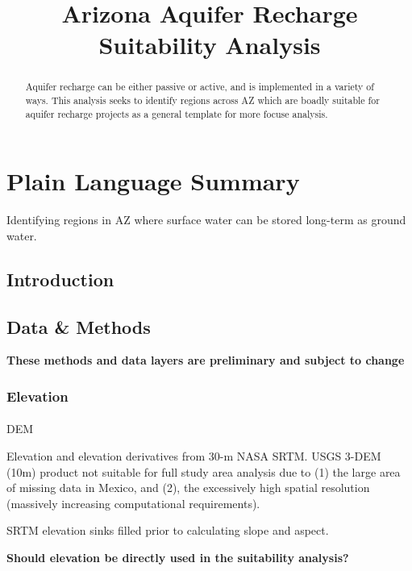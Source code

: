\documentclass[
]{agujournal2019}
\makeatletter
\let\oldparagraph\paragraph
\renewcommand{\paragraph}{
    \@ifstar
      \xxxParagraphStar
      \xxxParagraphNoStar
  }
\newcommand{\xxxParagraphStar}[1]{\oldparagraph*{#1}\mbox{}}
\newcommand{\xxxParagraphNoStar}[1]{\oldparagraph{#1}\mbox{}}
\makeatother
\begin{document}
\title{Arizona Aquifer Recharge Suitability Analysis}



\begin{abstract}
Aquifer recharge can be either passive or active, and is implemented in
a variety of ways. This analysis seeks to identify regions across AZ
which are boadly suitable for aquifer recharge projects as a general
template for more focuse analysis.
\end{abstract}

\section*{Plain Language Summary}
Identifying regions in AZ where surface water can be stored long-term as
ground water.




\subsection{Introduction}\label{introduction}

\subsection{Data \& Methods}\label{sec-data-methods}

\textbf{These methods and data layers are preliminary and subject to
change}

\subsubsection{Elevation}\label{elevation}

\paragraph{DEM}\label{dem}

Elevation and elevation derivatives from 30-m NASA SRTM. USGS 3-DEM
(10m) product not suitable for full study area analysis due to (1) the
large area of missing data in Mexico, and (2), the excessively high
spatial resolution (massively increasing computational requirements).

SRTM elevation sinks filled prior to calculating slope and aspect.

\textbf{Should elevation be directly used in the suitability analysis?}
\end{document}
